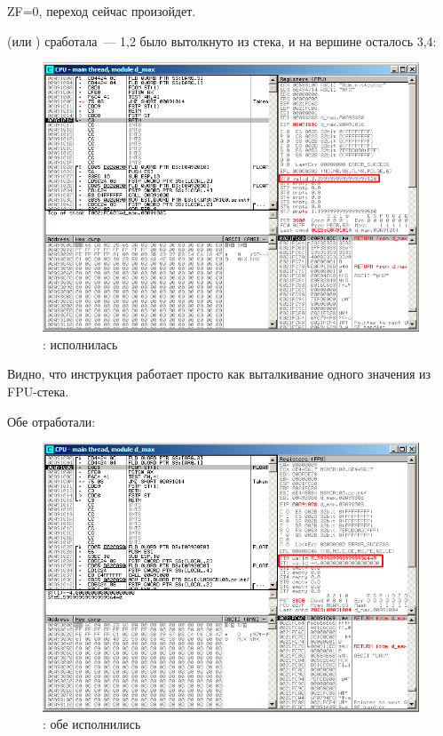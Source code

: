 ZF=0, переход сейчас произойдет.

\clearpage
{} (или \FSTP {}) сработала~--- 1,2 было вытолкнуто из стека, и на вершине осталось 3,4:

\begin{figure}[H]
\centering
\includegraphics[scale=\FigScale]{patterns/12_FPU/3_comparison/x86/MSVC_Ox/olly1_5.png}
\caption{\olly: \FSTP исполнилась}
\label{fig:FPU_comparison_Ox_case1_olly5}
\end{figure}

Видно, что инструкция  работает просто как выталкивание одного значения из FPU-стека.

\clearpage
{}

Обе \FLD отработали:

\begin{figure}[H]
\centering
\includegraphics[scale=\FigScale]{patterns/12_FPU/3_comparison/x86/MSVC_Ox/olly2_1.png}
\caption{\olly: обе \FLD исполнились}
\label{fig:FPU_comparison_Ox_case2_olly1}
\end{figure}

